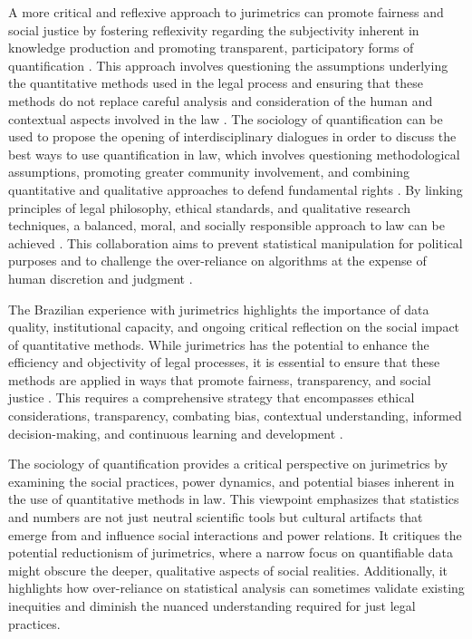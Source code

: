 A more critical and reflexive approach to jurimetrics can promote fairness and social justice by fostering reflexivity regarding the subjectivity inherent in knowledge production and promoting transparent, participatory forms of quantification \cite{10.1007/s11186-021-09453-1,1023071190721}. This approach involves questioning the assumptions underlying the quantitative methods used in the legal process and ensuring that these methods do not replace careful analysis and consideration of the human and contextual aspects involved in the law \cite{10.1007/s11186-021-09453-1,1023071190721}. The sociology of quantification can be used to propose the opening of interdisciplinary dialogues in order to discuss the best ways to use quantification in law, which involves questioning methodological assumptions, promoting greater community involvement, and combining quantitative and qualitative approaches to defend fundamental rights \cite{10.1007/s11186-021-09453-1,1023071190721}. By linking principles of legal philosophy, ethical standards, and qualitative research techniques, a balanced, moral, and socially responsible approach to law can be achieved \cite{10.1007/s11186-021-09453-1,1023071190721}. This collaboration aims to prevent statistical manipulation for political purposes and to challenge the over-reliance on algorithms at the expense of human discretion and judgment \cite{10.1007/s11186-021-09453-1,1023071190721}.

The Brazilian experience with jurimetrics highlights the importance of data quality, institutional capacity, and ongoing critical reflection on the social impact of quantitative methods. While jurimetrics has the potential to enhance the efficiency and objectivity of legal processes, it is essential to ensure that these methods are applied in ways that promote fairness, transparency, and social justice \cite{10.1590/dados.2022.65.3.267,1023071190721}. This requires a comprehensive strategy that encompasses ethical considerations, transparency, combating bias, contextual understanding, informed decision-making, and continuous learning and development \cite{10.1590/dados.2022.65.3.267,1023071190721}.

The sociology of quantification provides a critical perspective on jurimetrics by examining the social practices, power dynamics, and potential biases inherent in the use of quantitative methods in law. This viewpoint emphasizes that statistics and numbers are not just neutral scientific tools but cultural artifacts that emerge from and influence social interactions and power relations. It critiques the potential reductionism of jurimetrics, where a narrow focus on quantifiable data might obscure the deeper, qualitative aspects of social realities. Additionally, it highlights how over-reliance on statistical analysis can sometimes validate existing inequities and diminish the nuanced understanding required for just legal practices.

